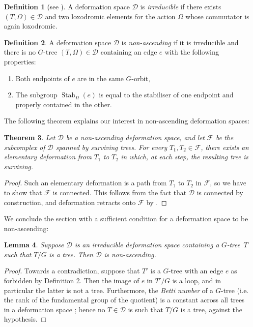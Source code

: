 \documentclass[svgnames]{amsart}
\theoremstyle{plain}
\newtheorem{thm}{Theorem}[section]
\newtheorem{lemma}[thm]{Lemma}
\theoremstyle{definition}
\newtheorem{defn}[thm]{Definition}
\newcommand{\Stab}[2]{\operatorname{Stab}_{#1}\left(#2\right)}
\begin{document}
\begin{defn}[{see \cite[Section 1.2]{GuirardelLevitt}}]
    A deformation space $\mathcal D$ is \emph{irreducible} if there exists $(T,\Omega)\in \mathcal D$ and two loxodromic elements for the action $\Omega$ whose commutator is again loxodromic.
\end{defn}

\begin{defn}\label{def:nonAscending}
    A deformation space $\mathcal{D}$ is \emph{non-ascending} if it is irreducible and there is no $G$-tree $(T,\Omega) \in \mathcal{D}$ containing an edge $e$ with the following properties:
    \begin{enumerate}
        \item Both endpoints of $e$ are in the same $G$-orbit,
        \item The subgroup $\Stab{\Omega}{e}$ is equal to the stabiliser of one endpoint and properly contained in the other.
    \end{enumerate}
\end{defn}

\noindent The following theorem explains our interest in non-ascending deformation spaces:
\begin{thm}\label{thm:GLSurvivingPath}
Let $\mathcal{D}$ be a non-ascending deformation space, and let $\mathcal{F}$ be the subcomplex of $\mathcal{D}$ spanned by surviving trees. For every $T_1, T_2\in \mathcal F$, there exists an elementary deformation from $T_1$ to $T_2$ in which, at each step, the resulting tree is surviving.
\end{thm}

\begin{proof} Such an elementary deformation is a path from $T_1$ to $T_2$ in $\mathcal F$, so we have to show that $\mathcal F$ is connected. This follows from the fact that $\mathcal D$ is connected by construction, and deformation retracts onto $\mathcal{F}$ by \cite[Theorem 7.6]{GL_def_trees}.
\end{proof}


\noindent We conclude the section with a sufficient condition for a deformation space to be non-ascending:
\begin{lemma}\label{lem:treeImpliesNonAscending}
    Suppose $\mathcal{D}$ is an irreducible deformation space containing a $G$-tree~$T$ such that $T/G$ is a tree. Then $\mathcal{D}$ is non-ascending.
\end{lemma}
\begin{proof}
    Towards a contradiction, suppose that $T'$ is a $G$-tree with an edge $e$ as forbidden by Definition \ref{def:nonAscending}. Then the image of $e$ in $T'/G$ is a loop, and in particular the latter is not a tree. Furthermore, the \emph{Betti number} of a $G$-tree (i.e. the rank of the fundamental group of the quotient) is a constant across all trees in a deformation space \cite[Section 4]{GL_def_trees}; hence no $T\in \mathcal{D}$ is such that $T/G$ is a tree, against the hypothesis.
\end{proof}
\end{document}
